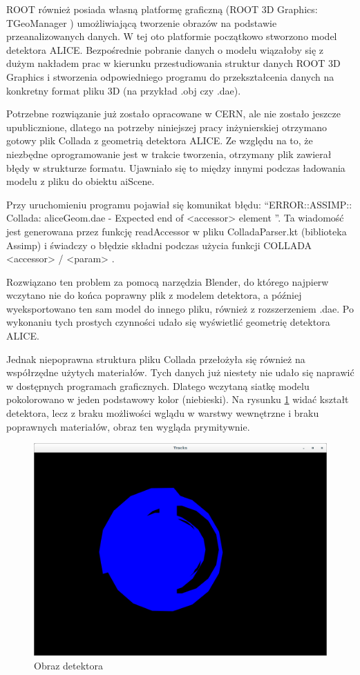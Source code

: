 ROOT również posiada własną platformę graficzną (ROOT 3D Graphics: TGeoManager \cite{root3dGraphics}) umożliwiającą tworzenie obrazów na podstawie przeanalizowanych danych. W tej oto platformie początkowo stworzono model detektora ALICE. Bezpośrednie pobranie danych o modelu wiązałoby się z dużym nakładem prac w kierunku przestudiowania struktur danych ROOT 3D Graphics i stworzenia odpowiedniego programu do przekształcenia danych na konkretny format pliku 3D (na przykład .obj czy .dae). 

Potrzebne rozwiązanie już zostało opracowane w CERN, ale nie zostało jeszcze upublicznione, dlatego na potrzeby niniejszej pracy inżynierskiej otrzymano gotowy plik Collada z geometrią detektora ALICE. Ze względu na to, że niezbędne oprogramowanie jest w trakcie tworzenia, otrzymany plik zawierał błędy w strukturze formatu. Ujawniało się to między innymi podczas ładowania modelu z pliku do obiektu aiScene. 

Przy uruchomieniu programu pojawiał się komunikat błędu: \textquotedblleft ERROR::ASSIMP:: Collada: aliceGeom.dae - Expected end of <accessor> element \textquotedblright . Ta wiadomość jest generowana przez funkcję readAccessor w pliku ColladaParser.kt (biblioteka Assimp) i świadczy o błędzie składni podczas użycia funkcji COLLADA <accessor> / <param> \cite{collada}.

Rozwiązano ten problem za pomocą narzędzia Blender, do którego najpierw wczytano nie do końca poprawny plik z modelem detektora, a później wyeksportowano ten sam model do innego pliku, również z rozszerzeniem .dae. Po wykonaniu tych prostych czynności udało się wyświetlić geometrię detektora ALICE. 

Jednak niepoprawna struktura pliku Collada przełożyła się również na współrzędne użytych materiałów. Tych danych już niestety nie udało się naprawić w dostępnych programach graficznych. Dlatego wczytaną siatkę modelu pokolorowano w jeden podstawowy kolor (niebieski). Na rysunku \ref{rys28} widać kształt detektora, lecz z braku możliwości wglądu w warstwy wewnętrzne i braku poprawnych materiałów, obraz ten wygląda prymitywnie.

\begin{figure}[H]
		\centering
 		\includegraphics[width=12.0cm]{myGeom.png}
    	\caption{Obraz detektora}
 		\label{rys28}
\end{figure}

